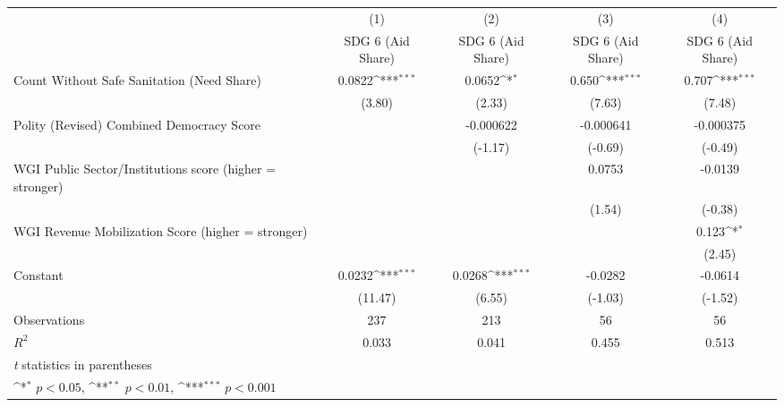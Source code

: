 {
\def\sym#1{\ifmmode^{#1}\else\(^{#1}\)\fi}
\begin{tabular}{l*{4}{c}}
\hline\hline
                &\multicolumn{1}{c}{(1)}&\multicolumn{1}{c}{(2)}&\multicolumn{1}{c}{(3)}&\multicolumn{1}{c}{(4)}\\
                &\multicolumn{1}{c}{SDG 6 (Aid Share)}&\multicolumn{1}{c}{SDG 6 (Aid Share)}&\multicolumn{1}{c}{SDG 6 (Aid Share)}&\multicolumn{1}{c}{SDG 6 (Aid Share)}\\
\hline
Count Without Safe Sanitation (Need Share)&   0.0822\sym{***}&   0.0652\sym{*}  &    0.650\sym{***}&    0.707\sym{***}\\
                &   (3.80)         &   (2.33)         &   (7.63)         &   (7.48)         \\
[1em]
Polity (Revised) Combined Democracy Score&                  &-0.000622         &-0.000641         &-0.000375         \\
                &                  &  (-1.17)         &  (-0.69)         &  (-0.49)         \\
[1em]
WGI Public Sector/Institutions score (higher = stronger)&                  &                  &   0.0753         &  -0.0139         \\
                &                  &                  &   (1.54)         &  (-0.38)         \\
[1em]
WGI Revenue Mobilization Score (higher = stronger)&                  &                  &                  &    0.123\sym{*}  \\
                &                  &                  &                  &   (2.45)         \\
[1em]
Constant        &   0.0232\sym{***}&   0.0268\sym{***}&  -0.0282         &  -0.0614         \\
                &  (11.47)         &   (6.55)         &  (-1.03)         &  (-1.52)         \\
\hline
Observations    &      237         &      213         &       56         &       56         \\
\(R^{2}\)       &    0.033         &    0.041         &    0.455         &    0.513         \\
\hline\hline
\multicolumn{5}{l}{\footnotesize \textit{t} statistics in parentheses}\\
\multicolumn{5}{l}{\footnotesize \sym{*} \(p<0.05\), \sym{**} \(p<0.01\), \sym{***} \(p<0.001\)}\\
\end{tabular}
}
